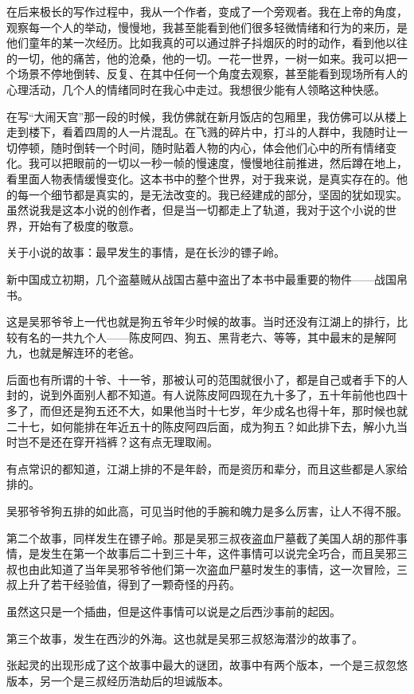 在后来极长的写作过程中，我从一个作者，变成了一个旁观者。我在上帝的角度，观察每一个人的举动，慢慢地，我甚至能看到他们很多轻微情绪和行为的来历，是他们童年的某一次经历。比如我真的可以通过胖子抖烟灰的时的动作，看到他以往的一切，他的痛苦，他的沧桑，他的一切。一花一世界，一树一如来。我可以把一个场景不停地倒转、反复、在其中任何一个角度去观察，甚至能看到现场所有人的心理活动，几个人的情绪同时在我心中走过。我想很少能有人领略这种快感。

在写“大闹天宫”那一段的时候，我仿佛就在新月饭店的包厢里，我仿佛可以从楼上走到楼下，看着四周的人一片混乱。在飞溅的碎片中，打斗的人群中，我随时让一切停顿，随时倒转一个时间，随时贴着人物的内心，体会他们心中的所有情绪变化。我可以把眼前的一切以一秒一帧的慢速度，慢慢地往前推进，然后蹲在地上，看里面人物表情缓慢变化。这本书中的整个世界，对于我来说，是真实存在的。他的每一个细节都是真实的，是无法改变的。我已经建成的部分，坚固的犹如现实。虽然说我是这本小说的创作者，但是当一切都走上了轨道，我对于这个小说的世界，开始有了极度的敬意。

关于小说的故事：最早发生的事情，是在长沙的镖子岭。

新中国成立初期，几个盗墓贼从战国古墓中盗出了本书中最重要的物件——战国帛书。

这是吴邪爷爷上一代也就是狗五爷年少时候的故事。当时还没有江湖上的排行，比较有名的一共九个人——陈皮阿四、狗五、黑背老六、等等，其中最末的是解阿九，也就是解连环的老爸。

后面也有所谓的十爷、十一爷，那被认可的范围就很小了，都是自己或者手下的人封的，说到外面别人都不知道。有人说陈皮阿四现在九十多了，五十年前他也四十多了，而但还是狗五还不大，如果他当时十七岁，年少成名也得十年，那时候也就二十七，如何能排在年近五十的陈皮阿四后面，成为狗五？如此排下去，解小九当时岂不是还在穿开裆裤？这有点无理取闹。

有点常识的都知道，江湖上排的不是年龄，而是资历和辈分，而且这些都是人家给排的。

吴邪爷爷狗五排的如此高，可见当时他的手腕和魄力是多么厉害，让人不得不服。

第二个故事，同样发生在镖子岭。那是吴邪三叔夜盗血尸墓截了美国人胡的那件事情，是发生在第一个故事后二十到三十年，这件事情可以说完全巧合，而且吴邪三叔也由此知道了当年吴邪爷爷他们第一次盗血尸墓时发生的事情，这一次冒险，三叔上升了若干经验值，得到了一颗奇怪的丹药。

虽然这只是一个插曲，但是这件事情可以说是之后西沙事前的起因。

第三个故事，发生在西沙的外海。这也就是吴邪三叔怒海潜沙的故事了。

张起灵的出现形成了这个故事中最大的谜团，故事中有两个版本，一个是三叔忽悠版本，另一个是三叔经历浩劫后的坦诚版本。

